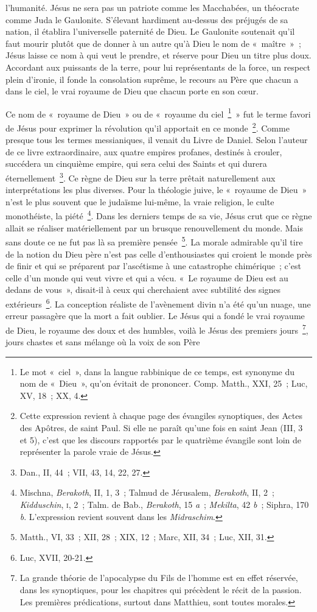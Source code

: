 \documentclass[french,twoside]{book} %
\begin{document}
l’humanité. Jésus ne sera pas un patriote comme les Macchabées, un théocrate comme Juda le Gaulonite. S’élevant hardiment au-dessus des préjugés de sa nation, il établira l’universelle paternité de Dieu. Le Gaulonite soutenait qu’il faut mourir plutôt que de donner à un autre qu’à Dieu le nom de « maître » ; Jésus laisse ce nom à qui veut le prendre, et réserve pour Dieu un titre plus doux. Accordant aux puissants de la terre, pour lui représentants de la force, un respect plein d’ironie, il fonde la consolation suprême, le recours au Père que chacun a dans le ciel, le vrai royaume de Dieu que chacun porte en son cœur.\par
Ce nom de « royaume de Dieu » ou de « royaume du ciel \footnote{Le mot « ciel », dans la langue rabbinique de ce temps, est synonyme du nom de « Dieu », qu’on évitait de prononcer. Comp. Matth., XXI, 25 ; Luc, XV, 18 ; XX, 4.} » fut le terme favori de Jésus pour exprimer la révolution qu’il apportait en ce monde \footnote{Cette expression revient à chaque page des évangiles synoptiques, des Actes des Apôtres, de saint Paul. Si elle ne paraît qu’une fois en saint Jean (III, 3 et 5), c’est que les discours rapportés par le quatrième évangile sont loin de représenter la parole vraie de Jésus.}. Comme presque tous les termes messianiques, il venait du Livre de Daniel. Selon l’auteur de ce livre extraordinaire, aux quatre empires profanes, destinés à crouler, succédera un cinquième empire, qui sera celui des Saints et qui durera éternellement \footnote{Dan., II, 44 ; VII, 43, 14, 22, 27.}. Ce règne de Dieu sur la terre prêtait naturellement aux interprétations les plus diverses. Pour la théologie juive, le « royaume de Dieu » n’est le plus souvent que le judaïsme lui-même, la vraie religion, le culte monothéiste, la piété \footnote{ Mischna, {\itshape Berakoth}, II, 1, 3 ; Talmud de Jérusalem, {\itshape Berakoth}, II, 2 ; {\itshape Kidduschin}, \textsc{i}, 2 ; Talm. de Bab., {\itshape Berakoth}, 15 {\itshape a} ; {\itshape Mekilta}, 42 {\itshape b} ; Siphra, 170 {\itshape b}. L’expression revient souvent dans les {\itshape Midraschim}.}. Dans les derniers temps de sa vie, Jésus crut que ce règne allait se réaliser matériellement par un brusque renouvellement du monde. Mais sans doute ce ne fut pas là sa première pensée \footnote{Matth., VI, 33 ; XII, 28 ; XIX, 12 ; Marc, XII, 34 ; Luc, XII, 31.}. La morale admirable qu’il tire de la notion du Dieu père n’est pas celle d’enthousiastes qui croient le monde près de finir et qui se préparent par l’ascétisme à une catastrophe chimérique ; c’est celle d’un monde qui veut vivre et qui a vécu. « Le royaume de Dieu est au dedans de vous », disait-il à ceux qui cherchaient avec subtilité des signes extérieurs \footnote{Luc, XVII, 20-21.}. La conception réaliste de l’avènement divin n’a été qu’un nuage, une erreur passagère que la mort a fait oublier. Le Jésus qui a fondé le vrai royaume de Dieu, le royaume des doux et des humbles, voilà le Jésus des premiers jours \footnote{La grande théorie de l’apocalypse du Fils de l’homme est en effet réservée, dans les synoptiques, pour les chapitres qui précèdent le récit de la passion. Les premières prédications, surtout dans Matthieu, sont toutes morales.}, jours chastes et sans mélange où la voix de son Père 
\end{document}
